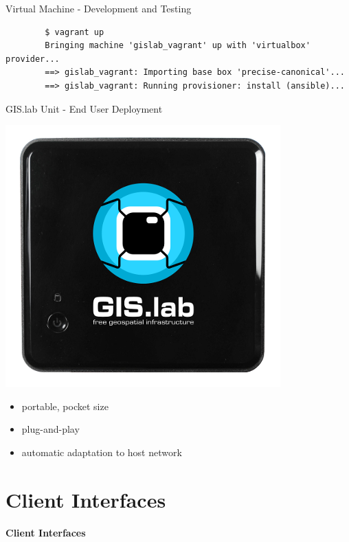 \documentclass[12pt]{beamer}
\begin{document}
\begin{frame}[fragile]{Virtual Machine - Development and Testing}
   \lstset{language=sh}
	\begin{lstlisting}
		$ vagrant up
		Bringing machine 'gislab_vagrant' up with 'virtualbox' provider...
		==> gislab_vagrant: Importing base box 'precise-canonical'...
		==> gislab_vagrant: Running provisioner: install (ansible)...
	\end{lstlisting}
\end{frame}

\begin{frame}{GIS.lab Unit - End User Deployment}
	\begin{center}
		\includegraphics[keepaspectratio=true,height=0.5\textheight]{images/gislab-unit.png}
	\end{center}
	\begin{itemize}
		\item portable, pocket size
		\item plug-and-play
		\item automatic adaptation to host network
	\end{itemize}
\end{frame}


\section{Client Interfaces}
\begin{frame}
	\begin{center}
		\LARGE\textbf{Client Interfaces}
	\end{center}
\end{frame}
\end{document}

